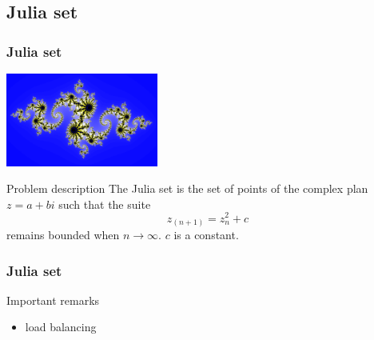 \subsection{Julia set}
\begin{frame}[containsverbatim]
\frametitle{Julia set}
\begin{center}
\includegraphics[width=5.0cm]{Day2/images/julia2.png}
\end{center}
\begin{block}{Problem description}
The Julia set is the set of points of the complex plan $z = a + b i$ such that the suite
$$
z_{(n+1)} = z_n^2 + c
$$
remains bounded when $n \rightarrow \infty$. $c$ is a constant. 
\end{block}
\end{frame}
\begin{frame}[containsverbatim]
\frametitle{Julia set}
\begin{block}{Important remarks}
\begin{itemize}
	\item{load balancing}
\end{itemize}
\end{block}
\end{frame}



